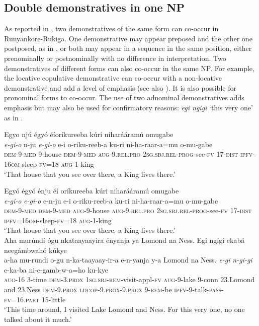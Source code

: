 \documentclass[output=paper 		  ]{langscibook}
\begin{document}
\subsection{Double demonstratives in one NP}\label{sec:asiimwe:3.3}

As reported in \citet{Asiimwe2014}, two demonstratives of the same form can co-occur in Run\-yan\-ko\-re-Ru\-ki\-ga. One demonstrative may appear preposed and the other one postposed, as in , or both may appear in a sequence in the same position, either prenominally  or postnominally with no difference in interpretation. Two demonstratives of different forms can also co-occur in the same NP. For example, the locative copulative demonstrative can co-occur with a non-locative demonstrative  and add a level of emphasis (see also ). It is also possible for pronominal forms to co-occur. The use of two adnominal demonstratives adds emphasis but may also be used for confirmatory reasons:  \textit{egi ngigi} ‘this very one’ as in .

\ea%
    \label{ex:asiimwe:37}
    \ea\label{ex:asiimwe:37a}  Egyo njú égyó éíoríkureeba kúri niharááramú omugabe\\
    \gll \emph{e-gi-o}  n-ju  \emph{e-gi-o}  e-i  o-riku-reeb-a  ku-ri  ni-ha-raar-a=mu  o-mu-gabe\\
    \textsc{dem-9-med}  9-house  \textsc{dem-9-med}  \textsc{aug-9.rel.pro}  \textsc{2sg.sbj.rel-prog-}see-\textsc{fv}
    \textsc{17-dist}  \textsc{ipfv}{}-16\textsc{om}{}-sleep-\textsc{fv=18}  \textsc{aug-}1-king\\
  \glt ‘That house that you see over there, a King lives there.’

  \ex\label{ex:asiimwe:37b}  Egyó égyó énju éí oríkureeba kúri niharááramú omugabe\\
    \gll \emph{e-gi-o}  \emph{e-gi-o}  e-n-ju  e-i  o-riku-reeb-a ku-ri  ni-ha-raar-a=mu  o-mu-gabe\\
    \textsc{dem-9-med}  \textsc{dem-9-med}  \textsc{aug-}9-house  \textsc{aug-9.rel.pro}  \textsc{2sg.sbj.rel-prog-}see-\textsc{fv}
\textsc{17-dist}  \textsc{ipfv}=16\textsc{om}{}-sleep-\textsc{fv=18}  \textsc{aug-}1-king\\
\glt ‘That house that you see over there, a King lives there.’
\z
\ex%
    \label{ex:asiimwe:38} \citet[210]{Asiimwe2014}\\
    Aha murúndí ógu nkataayaayira ényanja ya Lomond na Ness. Egi ngígí ekabá neegámbwahó  kúkye\\
    \gll a-ha  mu-rundi  o-gu  n-ka-taayaay-ir-a  e-n-yanja  y-a Lomond  na  Ness.  \emph{e-gi}  \emph{n-gi-gi}  e-ka-ba ni-e-gamb-w-a=ho  ku-kye\\
    \textsc{aug}{}-16  3-time  \textsc{dem}{}-3.\textsc{prox}  \textsc{1sg.sbj-rem}{}-visit-appl-\textsc{fv}  \textsc{aug}{}-9-lake  9-conn
23.Lomond  and  23.Ness  \textsc{dem}{}-9.\textsc{prox}  \textsc{ldcop}{}-9.\textsc{prox}{}-9.\textsc{prox}  9-\textsc{rem}{}-be
\textsc{ipfv}{}-9-talk-\textsc{pass-fv}=16.\textsc{part}  15-little \\ 
\glt ‘This time around, I visited Lake Lomond and Ness. For this very one, no one talked about it much.’
\z
\end{document}
